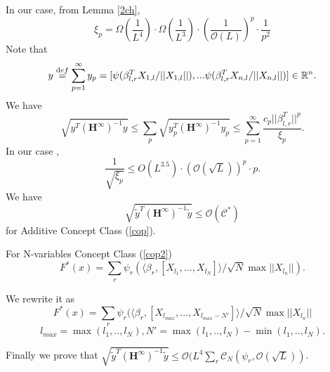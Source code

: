 \documentclass{article}
\newcommand{\cO}{\mathcal{O}}
\begin{document}
In our case, from Lemma \ref{2ch},
\begin{equation}
\xi_p=\Omega( \frac{1}{L^4})\cdot \Omega( \frac{1}{L^3}) \cdot (\frac{1}{\cO(L)})^{p}\cdot \frac{1}{p^2}
\end{equation}
Note that $$ y\overset{\text def}{=}\sum_{p=1}^\infty y_p=[\psi(\beta^T_{l,r}X_{1,l}/||X_{1,l}||),...\psi(\beta^T_{l,r}X_{n,l}/||X_{n,l}||)]\in \mathbb{R}^n.$$
We have
\begin{equation}\label{elast}
\sqrt{y^T(\bm{H}^\infty)^{-1}y}\leq \sum_p \sqrt{y^T_p(\bm{H}^\infty)^{-1}y_p}\leq \sum_{p=1}^\infty \frac{c_p||\beta^T_{l,r}||^{p}}{\xi_p}.
\end{equation}
In our case ,
\begin{equation}
\frac{1}{\sqrt{\xi_p}}\leq O( L^{3.5}) \cdot (\cO(\sqrt{L}))^{p}\cdot p.
\end{equation}
 We have
\begin{equation}\label{comp}
\sqrt{\widetilde{y}^T (\bm{H}^\infty)^{-1}\widetilde{y}}\leq \cO(\mathscr{C}^*)
\end{equation}
for Additive Concept Class (\ref{cop}).

For N-variables Concept Class (\ref{cop2})
$$F^*(x)=\sum_{r}\psi_{r}(\langle \beta_{r}, [X_{l_1},...,X_{l_{N}}]\rangle/\sqrt{N}\max||X_{l_n}||).$$

We rewrite it as
$$F^*(x)=\sum_{r}\psi_{r}(\langle \beta_{r}, [X_{l_{max}},...,X_{l_{max}-N'}]\rangle/\sqrt{N}\max||X_{l_n}||$$ $$l_{max}=\max(l_1,..,l_N), N'=\max(l_1,..,l_N)-\min(l_1,..,l_N).$$



Finally we prove that
$\sqrt{\widetilde{y}^T (\bm{H}^\infty)^{-1}\widetilde{y}}\leq \cO(L^4\sum_r\mathscr{C}_N(\psi_{r},\cO(\sqrt{L}))$.
\end{document}
